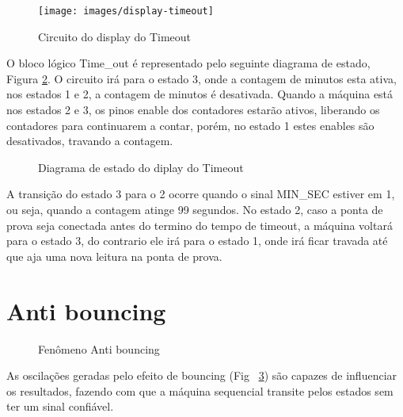 \documentclass[12pt,a4paper,openany]{abntex2}
\begin{document}
\begin{figure}[!htp]
	\centering
	\caption{Circuito do display do Timeout}
	\texttt{[image: images/display-timeout]}	\label{fig:display-timeout}
\end{figure}

O bloco lógico Time\_out é representado pelo seguinte diagrama de estado, Figura \ref{fig:diagrama-de-estado-display-timeout}. O circuito irá para o estado 3, onde a contagem de minutos esta ativa, nos estados 1 e 2, a contagem de minutos é desativada. Quando a máquina está nos estados 2 e 3, os pinos enable dos contadores estarão ativos, liberando os contadores para continuarem a contar, porém, no estado 1 estes enables são desativados, travando a contagem.

\begin{figure}[!htp]
	\centering
	\caption{Diagrama de estado do diplay do Timeout}
	\label{fig:diagrama-de-estado-display-timeout}
\end{figure}

A transição do estado 3 para o 2 ocorre quando o sinal MIN\_SEC estiver em 1, ou seja, quando a contagem atinge 99 segundos. No estado 2, caso a ponta de prova seja conectada antes do termino do tempo de timeout, a máquina voltará para o estado 3, do contrario ele irá para o estado 1, onde irá ficar travada até que aja uma nova leitura na ponta de prova.

\section{Anti bouncing}


\begin{figure}[!htp]
	\centering
	\caption{Fenômeno Anti bouncing}
	\label{fig:bounceTimingDiagram}
\end{figure}

As oscilações geradas pelo efeito de bouncing (Fig ~\ref{fig:bounceTimingDiagram}) são capazes de influenciar os resultados, fazendo com que a máquina sequencial transite pelos estados sem ter um sinal confiável.
\end{document}

